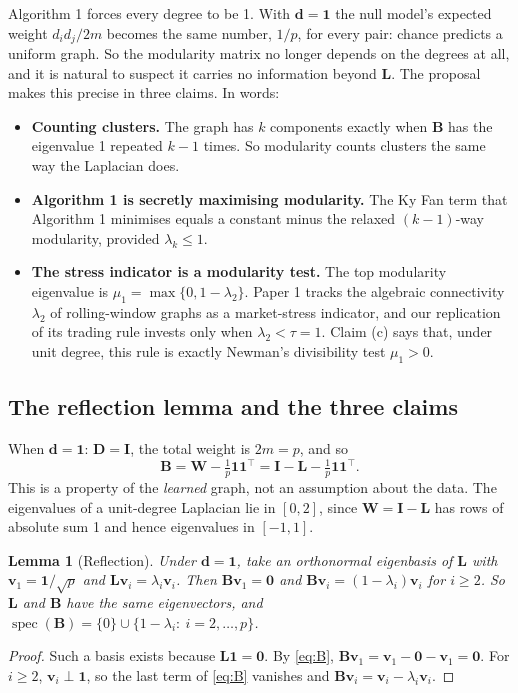 \documentclass[11pt,a4paper]{article}
\newcommand{\Lap}{\mathbf{L}}
\newcommand{\Wmat}{\mathbf{W}}
\newcommand{\Bmat}{\mathbf{B}}
\newcommand{\Dmat}{\mathbf{D}}
\newcommand{\Imat}{\mathbf{I}}
\newcommand{\dvec}{\mathbf{d}}
\newcommand{\vvec}{\mathbf{v}}
\newcommand{\one}{\mathbf{1}}
\newtheorem{lemma}{Lemma}
\theoremstyle{remark}
\begin{document}
Algorithm 1 forces every degree to be 1. With $\dvec=\one$ the null model's expected
weight $d_id_j/2m$ becomes the same number, $1/p$, for every pair: chance predicts a
uniform graph. So the modularity matrix no longer depends on the degrees at all, and it
is natural to suspect it carries no information beyond $\Lap$. The proposal makes this
precise in three claims. In words:
\begin{itemize}
\item[(a)] \textbf{Counting clusters.} The graph has $k$ components exactly when $\Bmat$
  has the eigenvalue 1 repeated $k-1$ times. So modularity counts clusters the same way
  the Laplacian does.
\item[(b)] \textbf{Algorithm 1 is secretly maximising modularity.} The Ky Fan term that
  Algorithm 1 minimises equals a constant minus the relaxed $(k-1)$-way modularity,
  provided $\lambda_k\le1$.
\item[(c)] \textbf{The stress indicator is a modularity test.} The top modularity
  eigenvalue is $\mu_1=\max\{0,1-\lambda_2\}$. Paper 1 tracks the algebraic connectivity
  $\lambda_2$ of rolling-window graphs as a market-stress indicator, and our replication
  of its trading rule invests only when $\lambda_2<\tau=1$. Claim (c) says that, under
  unit degree, this rule is exactly Newman's divisibility test $\mu_1>0$.
\end{itemize}

\subsection{The reflection lemma and the three claims}\label{sec:lemma}

When $\dvec=\one$: $\Dmat=\Imat$, the total weight is $2m=p$, and so
\begin{equation}\label{eq:B}
  \Bmat=\Wmat-\tfrac1p\one\one^\top=\Imat-\Lap-\tfrac1p\one\one^\top .
\end{equation}
This is a property of the \emph{learned} graph, not an assumption about the data. The
eigenvalues of a unit-degree Laplacian lie in $[0,2]$, since $\Wmat=\Imat-\Lap$ has rows
of absolute sum 1 and hence eigenvalues in $[-1,1]$.

\begin{lemma}[Reflection]\label{lem:core}
Under $\dvec=\one$, take an orthonormal eigenbasis of $\Lap$ with $\vvec_1=\one/\sqrt p$
and $\Lap\vvec_i=\lambda_i\vvec_i$. Then $\Bmat\vvec_1=\mathbf0$ and
$\Bmat\vvec_i=(1-\lambda_i)\vvec_i$ for $i\ge2$. So $\Lap$ and $\Bmat$ have the same
eigenvectors, and $\operatorname{spec}(\Bmat)=\{0\}\cup\{1-\lambda_i:\ i=2,\dots,p\}$.
\end{lemma}
\begin{proof}
Such a basis exists because $\Lap\one=\mathbf0$. By \eqref{eq:B},
$\Bmat\vvec_1=\vvec_1-\mathbf0-\vvec_1=\mathbf0$. For $i\ge2$, $\vvec_i\perp\one$, so
the last term of \eqref{eq:B} vanishes and $\Bmat\vvec_i=\vvec_i-\lambda_i\vvec_i$.
\end{proof}
\end{document}
